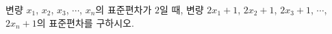 변량 $x_1$, $x_2$, $x_3$, $\cdots$, $x_n$의 표준편차가 $2$일 때, 변량 $2x_1+1$, $2x_2+1$, $2x_3+1$, $\cdots$, $2x_n+1$의 표준편차를 구하시오.

